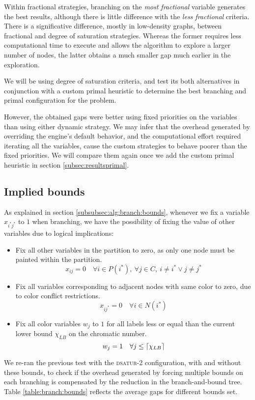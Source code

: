 Within fractional strategies, branching on the \textit{most fractional} variable generates the best results, although there is little difference with the \textit{less fractional} criteria. There is a significative difference, mostly in low-density graphs, between fractional and degree of saturation strategies. Whereas the former requires less computational time to execute and allows the algorithm to explore a larger number of nodes, the latter obtains a much smaller gap much earlier in the exploration.

We will be using degree of saturation criteria, and test its both alternatives in conjunction with a custom primal heuristic to determine the best branching and primal configuration for the problem.

However, the obtained gaps were better using fixed priorities on the variables than using either dynamic strategy. We may infer that the overhead generated by overriding the engine's default behavior, and the computational effort required iterating all the variables, cause the custom strategies to behave poorer than the fixed priorities. We will compare them again once we add the custom primal heuristic in section \ref{subsec:resultsprimal}.

\subsection{Implied bounds}

As explained in section \ref{subsubsec:alg:branch:bounds}, whenever we fix a variable $x_{i^*j^*}$ to $1$ when branching, we have the possibility of fixing the value of other variables due to logical implications:
\begin{itemize}
\item Fix all other variables in the partition to zero, as only one node must be painted within the partition.
\[
x_{ij} = 0 \quad \forall i \in P(i^*),\ \forall j \in C,\ i \neq i^* \vee j \neq j^*
\]
\item Fix all variables corresponding to adjacent nodes with same color to zero, due to color conflict restrictions.
\[
x_{ij^*} = 0 \quad \forall i \in N(i^*)
\]
\item Fix all color variables $w_j$ to $1$ for all labels less or equal than the current lower bound $\chi_{LB}$ on the chromatic number.
\[
w_j = 1 \quad \forall j \leq \left\lceil \chi_{LB} \right\rceil
\] 
\end{itemize}

We re-ran the previous test with the \textsc{dsatur-2} configuration, with and without these bounds, to check if the overhead generated by forcing multiple bounds on each branching is compensated by the reduction in the branch-and-bound tree. Table \ref{table:branch:bounds} reflects the average gaps for different bounds set.

